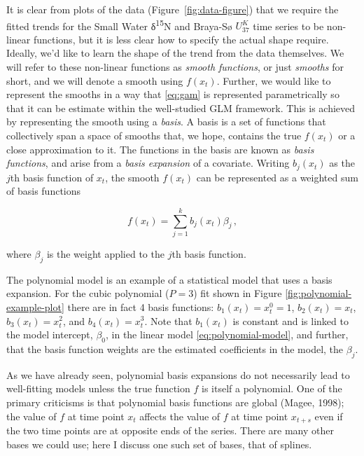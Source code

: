 \documentclass[12pt,]{article}
\newcommand{\uk}{\ensuremath{\mathit{U}^{\mathit{K}}_{\mathup{37}}}}
\begin{document}
It is clear from plots of the data (Figure~\ref{fig:data-figure}) that
we require the fitted trends for the Small Water δ\textsuperscript{15}N
and Braya-Sø \uk{} time series to be non-linear functions, but it is
less clear how to specify the actual shape require. Ideally, we'd like
to learn the shape of the trend from the data themselves. We will refer
to these non-linear functions as \emph{smooth functions}, or just
\emph{smooths} for short, and we will denote a smooth using \(f(x_t)\).
Further, we would like to represent the smooths in a way that
\eqref{eq:gam} is represented parametrically so that it can be estimate
within the well-studied GLM framework. This is achieved by representing
the smooth using a \emph{basis}. A basis is a set of functions that
collectively span a space of smooths that, we hope, contains the true
\(f(x_t)\) or a close approximation to it. The functions in the basis
are known as \emph{basis functions}, and arise from a \emph{basis
expansion} of a covariate. Writing \(b_j(x_t)\) as the \(j\)th basis
function of \(x_t\), the smooth \(f(x_t)\) can be represented as a
weighted sum of basis functions

\begin{equation*}
f(x_t) = \sum_{j = 1}^{k} b_j(x_t) \beta_j \,,
\end{equation*}

where \(\beta_j\) is the weight applied to the \(j\)th basis function.

The polynomial model is an example of a statistical model that uses a
basis expansion. For the cubic polynomial (\(P = 3\)) fit shown in
Figure \ref{fig:polynomial-example-plot} there are in fact 4 basis
functions: \(b_1(x_t) = x_t^0 = 1\), \(b_2(x_t) = x_t\),
\(b_3(x_t) = x^2_t\), and \(b_4(x_t) = x_t^3\). Note that \(b_1(x_t)\)
is constant and is linked to the model intercept, \(\beta_0\), in the
linear model \eqref{eq:polynomial-model}, and further, that the basis
function weights are the estimated coefficients in the model, the
\(\beta_j\).

As we have already seen, polynomial basis expansions do not necessarily
lead to well-fitting models unless the true function \(f\) is itself a
polynomial. One of the primary criticisms is that polynomial basis
functions are global (Magee, 1998); the value of \(f\) at time point
\(x_t\) affects the value of \(f\) at time point \(x_{t+s}\) even if the
two time points are at opposite ends of the series. There are many other
bases we could use; here I discuss one such set of bases, that of
splines.
\end{document}
